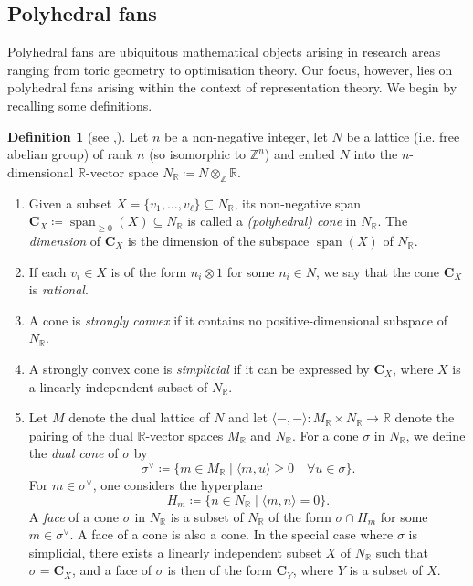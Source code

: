 \documentclass[10pt,twoside, a4paper,reqno]{amsart}
\DeclareMathOperator{\spann}{span}
\newcommand{\sth}{\;\vert\;}
\newcommand{\R}{\mathbb{R}}
\newcommand{\boldC}{\mathbf{C}}
\newcommand{\Z}{\mathbb{Z}}
\theoremstyle{definition}
\newtheorem{definition}[theorem]{Definition}
\begin{document}
\subsection{Polyhedral fans}
Polyhedral fans are ubiquitous mathematical objects arising in research areas ranging from toric geometry to optimisation theory. Our focus, however, lies on polyhedral fans arising within the context of representation theory. We begin by recalling some definitions.

\begin{definition}[{see \cite{Zie95},\cite{CLS24}}]\label{def:cones+fans}
    Let $n$ be a non-negative integer, let $N$ be a lattice (i.e. free abelian group) of rank $n$ {(so isomorphic to $\Z^n$)} and embed $N$ into the $n$-dimensional $\R$-vector space $N_{\R}\coloneqq N\otimes_{\Z}\R$.
    \begin{enumerate}
        \item Given a subset $X=\{v_1 , \dots , v_{\ell}\}\subseteq N_{\R}$, its {non-negative} span $\boldC_{X}\coloneqq \spann_{\geq 0}(X) \subseteq N_{\R}$ is called a \textit{(polyhedral) cone} in $N_{\R}$. {The \textit{dimension} of $\boldC_{X}$ is the dimension of {the subspace} $\spann(X)$ of $N_{\R}$.}
        \item If each $v_i\in X$ is of the form $n_i\otimes 1$ for some $n_i\in N$, we say that the cone $\boldC_{X}$ is \textit{rational}.
        \item A cone is \textit{strongly convex} if it contains no positive-dimensional subspace of $N_{\R}$.
        \item A strongly convex cone is \textit{simplicial} if {it can be expressed by} $\boldC_{X}$, where $X$ is a linearly independent subset of $N_{\R}$. 
        \item Let $M$ denote the dual lattice of $N$ and let $\langle -, - \rangle\colon M_{\R}\times N_{\R} \to \R$ denote the pairing of the dual $\R$-vector spaces $M_{\R}$ and $N_{\R}$. For a cone $\sigma$ in $N_{\R}$, we define the \textit{dual cone} of $\sigma$ by 
        \begin{equation*}
            \sigma^{\vee} \coloneqq \{m \in M_{\R} \sth \langle m, u \rangle \geq 0 \quad \forall u\in\sigma \}.
        \end{equation*}
        For $m\in \sigma^{\vee}$, one considers the hyperplane
        \begin{equation*}
            H_m \coloneqq \{n \in N_{\R} \sth \langle m, n \rangle = 0 \}.
        \end{equation*}
        A \textit{face} of a {cone} $\sigma$ {in $N_{\R}$} is a subset of $N_{\R}$ of the form $\sigma\cap H_m$ for some $m\in \sigma^{\vee}$. A face of a cone is also a cone. In the special case where $\sigma$ is simplicial, there exists a linearly independent subset $X$ of $N_{\R}$ such that $\sigma=\boldC_{X}$, and a face of $\sigma$ is then of the form $\boldC_{Y}$, where $Y$ is a subset of $X$.

\end{enumerate}
\end{definition}
\end{document}
